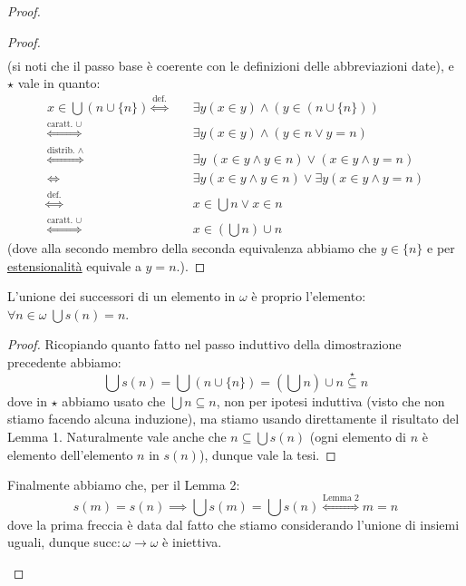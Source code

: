 \documentclass[11pt]{scrartcl}
\begin{document}
\begin{proof}
\begin{enumerate}
\begin{proof}
\[\begin{split}
							\end{split}
						\]
						(si noti che il passo base è coerente con le definizioni delle abbreviazioni date), e $\star$ vale in quanto:
						\[ \begin{split}
							x \in \bigcup(n \cup \{n\}) \overset{\text{def.}}{\iff} &\quad \exists y ( x \in y) \land (y \in (n \cup\{n\})) \\
														\overset{\text{caratt. $\cup$}}{\iff} &\quad \exists y( x \in y) \land (y \in n \lor y = n)\\
														\overset{\text{distrib. $\land$}}{\iff} &\quad \exists y \; ( x \in y \land y \in n) \lor (x \in y \land y = n)\\
														\iff &\quad \exists y ( x \in y \land y \in n) \lor \exists y(x \in y \land y = n)\\
														\overset{\text{def.}}{\iff} &\quad x \in \bigcup n \lor x \in n\\
														\overset{\text{caratt. $\cup$}}{\iff} &\quad x \in \left(\bigcup n\right) \cup n
						\end{split}
							\]
						(dove alla secondo membro della seconda equivalenza abbiamo che $y \in \{n\}$ e per \hyperref[ax2]{estensionalità} equivale a $y = n$.).
					\end{proof}
					\begin{lemma}
						[Lemma 2]
						L'unione dei successori di un elemento in $\omega$ è proprio l'elemento: $\forall n \in \omega \; \bigcup s(n) = n$.
					\end{lemma}
					\begin{proof}
						Ricopiando quanto fatto nel passo induttivo della dimostrazione precedente abbiamo:
						\[ \bigcup s(n) = \bigcup (n \cup \{n\}) = \left(\bigcup n\right) \cup n \overset{\star}{\subseteq} n
							\]
						dove in $\star$ abbiamo usato che $\bigcup n \subseteq n$, non per ipotesi induttiva (visto che non stiamo facendo alcuna induzione), ma stiamo usando direttamente il risultato del Lemma 1.
						Naturalmente vale anche che $n \subseteq \bigcup s(n)$ (ogni elemento di $n$ è elemento dell'elemento $n$ in $s(n)$), dunque vale la tesi.
					\end{proof}
					Finalmente abbiamo che, per il Lemma 2:
					\[ s(m) = s(n) \implies \bigcup s(m) = \bigcup s(n) \overset{\text{Lemma 2}}{\iff} m = n
						\]
					dove la prima freccia è data dal fatto che stiamo considerando l'unione di insiemi uguali, dunque succ$: \omega \rightarrow \omega$ è iniettiva.
	\end{enumerate}
\end{proof}
\end{document}
